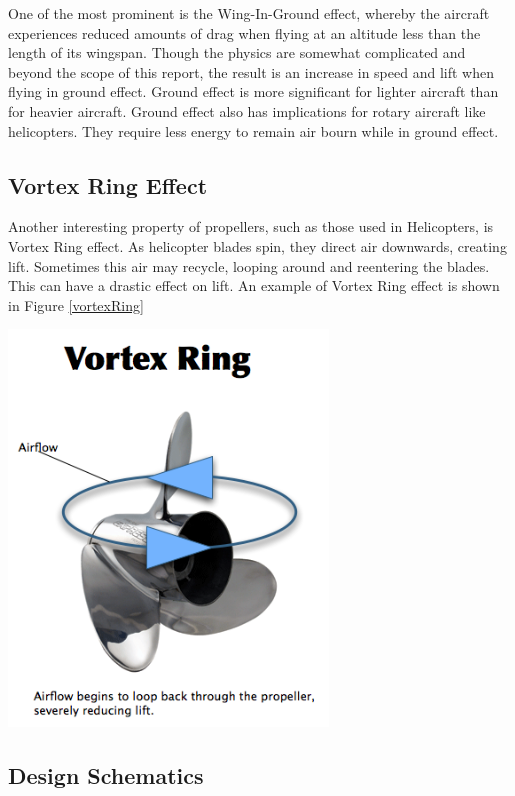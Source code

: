 One of the most prominent is the Wing-In-Ground effect, whereby the aircraft experiences reduced amounts of drag when flying at an altitude less than the length of its wingspan. Though the physics are somewhat complicated and beyond the scope of this report, the result is an increase in speed and lift when flying in ground effect. Ground effect is more significant for lighter aircraft than for heavier aircraft. Ground effect also has implications for rotary aircraft like helicopters. They require less energy to remain air bourn while in ground effect.

\subsection{Vortex Ring Effect}
Another interesting property of propellers, such as those used in Helicopters, is Vortex Ring effect. As helicopter blades spin, they direct air downwards, creating lift. Sometimes this air may recycle, looping around and reentering the blades. This can have a drastic effect on lift.  An example of Vortex Ring effect is shown in Figure \ref{vortexRing}

  \begin{minipage}{6.5in}
  \begin{center}
    \includegraphics[width=85mm]{imageSources/vortexRing.png}
  \end{center}
  \label{vortexRing}
  \end{minipage}

\subsection{Design Schematics}

